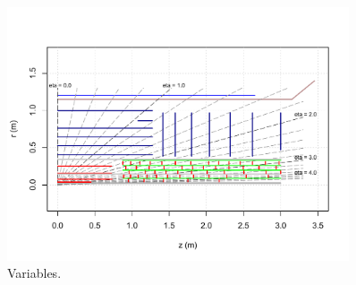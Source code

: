 \begin{figure}[!htpb]
  \centering
  \includegraphics[width=0.90\textwidth]{figures/PLOT-UPGRADE-2014-001/fig_08}
  \caption{Variables.}
  \label{fig:prospects-hllhc-layout}
\end{figure}


